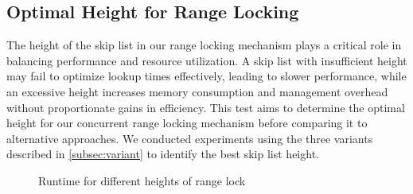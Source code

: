 \subsection{Optimal Height for Range Locking}

The height of the skip list in our range locking mechanism plays a critical role in balancing performance and resource utilization. A skip list with insufficient height may fail to optimize lookup times effectively, leading to slower performance, while an excessive height increases memory consumption and management overhead without proportionate gains in efficiency. This test aims to determine the optimal height for our concurrent range locking mechanism before comparing it to alternative approaches. We conducted experiments using the three variants described in \ref{subsec:variant} to identify the best skip list height.

\begin{figure}[h]
    \centering
    \caption{Runtime for different heights of range lock}
\end{figure}


